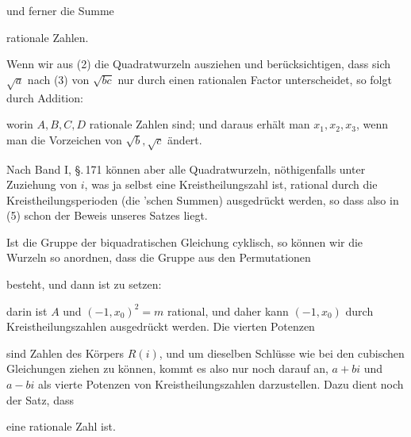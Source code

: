 und ferner die Summe


rationale Zahlen.

Wenn wir aus (2) die Quadratwurzeln ausziehen und berücksichtigen, dass sich
$\sqrt{a}$ nach (3) von $\sqrt{bc}$ nur durch einen rationalen Factor
unterscheidet, so folgt durch Addition:


worin $A, B, C, D$ rationale Zahlen sind; und daraus erhält man $x_1, x_2,
x_3$, wenn man die Vorzeichen von $\sqrt{b}, \sqrt{c}$ ändert.

Nach Band I, \S.\,171 können aber alle Quadratwurzeln, nöthigenfalls unter
Zuziehung von $i$, was ja selbst eine Kreistheilungszahl ist, rational durch
die Kreistheilungsperioden (die 'schen Summen) ausgedrückt
werden, so dass also in (5) schon der Beweis unseres Satzes liegt.

\noindent\hrulefill

Ist die Gruppe der biquadratischen Gleichung cyklisch, so können wir die
Wurzeln so anordnen, dass die Gruppe aus den Permutationen


besteht, und dann ist zu setzen:


darin ist $A$ und $(-1,x_0)^2=m$ rational, und daher kann $(-1,x_0)$ durch
Kreistheilungszahlen ausgedrückt werden. Die vierten Potenzen


sind Zahlen des Körpers $R(i)$, und um dieselben Schlüsse wie bei den
cubischen Gleichungen ziehen zu können, kommt es also nur noch darauf an,
$a+bi$ und $a-bi$ als vierte Potenzen von Kreistheilungszahlen darzustellen.
Dazu dient noch der Satz, dass


eine rationale Zahl ist.
